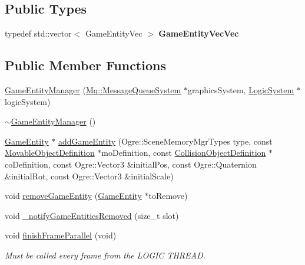 \subsection*{Public Types}
\begin{DoxyCompactItemize}
\item 
\mbox{\label{class_common_1_1_game_entity_manager_a661304519d61a1bccf8fd1889cb56964}} 
typedef std\+::vector$<$ Game\+Entity\+Vec $>$ {\bfseries Game\+Entity\+Vec\+Vec}
\end{DoxyCompactItemize}
\subsection*{Public Member Functions}
\begin{DoxyCompactItemize}
\item 
\hyperlink{class_common_1_1_game_entity_manager_abd796010d78cf6d9b6b6f8f7eddbba89}{Game\+Entity\+Manager} (\hyperlink{class_common_1_1_mq_1_1_message_queue_system}{Mq\+::\+Message\+Queue\+System} $\ast$graphics\+System, \hyperlink{class_common_1_1_logic_system}{Logic\+System} $\ast$logic\+System)
\item 
\hyperlink{class_common_1_1_game_entity_manager_aed2c3af1b541c879abf7d78f43085e79}{$\sim$\+Game\+Entity\+Manager} ()
\item 
\hyperlink{struct_common_1_1_game_entity}{Game\+Entity} $\ast$ \hyperlink{class_common_1_1_game_entity_manager_a982abe1d421f8a59fb1ca21ebca97b5f}{add\+Game\+Entity} (Ogre\+::\+Scene\+Memory\+Mgr\+Types type, const \hyperlink{struct_common_1_1_movable_object_definition}{Movable\+Object\+Definition} $\ast$mo\+Definition, const \hyperlink{struct_common_1_1_collision_object_definition}{Collision\+Object\+Definition} $\ast$co\+Definition, const Ogre\+::\+Vector3 \&initial\+Pos, const Ogre\+::\+Quaternion \&initial\+Rot, const Ogre\+::\+Vector3 \&initial\+Scale)
\item 
void \hyperlink{class_common_1_1_game_entity_manager_ab08fbd68fbafbf170abe71f7815b7a13}{remove\+Game\+Entity} (\hyperlink{struct_common_1_1_game_entity}{Game\+Entity} $\ast$to\+Remove)
\item 
void \hyperlink{class_common_1_1_game_entity_manager_ac1cb3aaa00139aaaca96a96e391fa2dc}{\+\_\+notify\+Game\+Entities\+Removed} (size\+\_\+t slot)
\item 
\mbox{\label{class_common_1_1_game_entity_manager_a3f8cae1b23e5f53152c1af65b250dcdd}} 
void \hyperlink{class_common_1_1_game_entity_manager_a3f8cae1b23e5f53152c1af65b250dcdd}{finish\+Frame\+Parallel} (void)
\begin{DoxyCompactList}\small\item\em Must be called every frame from the L\+O\+G\+IC T\+H\+R\+E\+AD. \end{DoxyCompactList}\end{DoxyCompactItemize}
